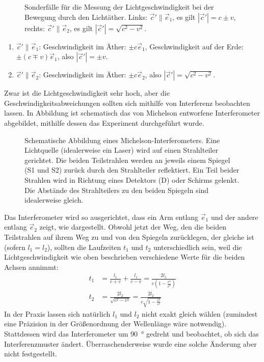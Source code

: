\begin{figure}[htp]
    \centering
    \tfigBewegungDurchLichtaetherB
    \caption{Sonderfälle für die Messung der Lichtgeschwindigkeit bei der Bewegung durch den Lichtäther. Links: $\vec c'\parallel\vec e_1$, es gilt $|\vec c'|=c\pm v$, rechts: $\vec c'\parallel \vec e_2$, es gilt $|\vec c'|=\sqrt{c^2-v^2}$.}
    \label{fig:bewegung_durch_lichtaetherB}
\end{figure}

\begin{enumerate}
    \item $\vec c'\parallel \vec e_1$: Geschwindigkeit im Äther: $\pm c \vec e_1$, Geschwindigkeit auf der Erde: $\pm(c\mp v)\vec e_1$, also $|\vec c'|=\pm v$.
    \item $\vec c'\parallel \vec e_2$: Geschwindigkeit im Äther: $\pm c \vec e_2$, also $|\vec c'|=\sqrt{c^2-v^2}$.
\end{enumerate}


Zwar ist die Lichtgeschwindigkeit sehr hoch, aber die Geschwindigkeitsabweichungen sollten sich mithilfe von Interferenz beobachten lassen. In Abbildung  ist schematisch das von Michelson entworfene Interferometer abgebildet, mithilfe dessen das Experiment durchgeführt wurde.

\begin{figure}[htb]
    \centering
    \tfigMichelsonInterferometer
    \caption{Schematische Abbildung eines Michelson-Interferometers. Eine Lichtquelle (idealerweise ein Laser) wird auf einen Strahlteiler gerichtet. Die beiden Teilstrahlen werden an jeweils einem Spiegel (S1 und S2) zurück durch den Strahlteiler reflektiert. Ein Teil beider Strahlen wird in Richtung eines Detektors (D) oder Schirms gelenkt. Die Abstände des Strahlteilers zu den beiden Spiegeln sind idealerweise gleich. }
    \label{fig:michelson_interferometer}
\end{figure}

Das Interferometer wird so ausgerichtet, dass ein Arm entlang $\vec e_1$ und der andere entlang $\vec e_2$ zeigt, wie dargestellt.
Obwohl jetzt der Weg, den die beiden Teilstrahlen auf ihrem Weg zu und von den Spiegeln zurücklegen, der gleiche ist (sofern $l_1=l_2$), sollten die Laufzeiten $t_1$ und $t_2$ unterschiedlich sein, weil die Lichtgeschwindigkeit wie oben beschrieben verschiedene Werte für die beiden Achsen annimmt:
\begin{align*}
    t_1 & = \frac{l_1}{c+v}+\frac{l_1}{c-v}=\frac{2l_1}{c\left(1-\frac{v^2}{c^2}\right)} \\
    t_2 & = \frac{2l_2}{\sqrt{c^2-v^2}} = \frac{2l_2}{c\sqrt{1-\frac{v^2}{c^2}}}
\end{align*}
In der Praxis lassen sich natürlich $l_1$ und $l_2$ nicht exakt gleich wählen (zumindest eine Präzision in der Größenordnung der Wellenlänge wäre notwendig). Stattdessen wird das Interferometer um \SI{90}{\degree} gedreht und beobachtet, ob sich das Interferenzmuster ändert.
Überraschenderweise wurde eine solche Änderung aber nicht festgestellt.

